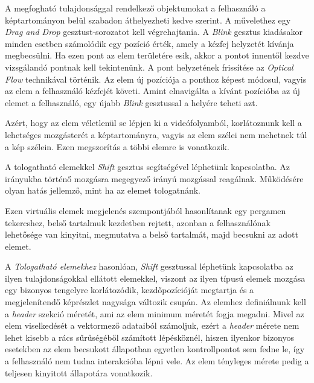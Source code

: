 
A megfogható tulajdonsággal rendelkező objektumokat a felhasználó a képtartományon belül szabadon áthelyezheti kedve szerint. A művelethez egy \textit{Drag and Drop} gesztust-sorozatot kell végrehajtania. A \textit{Blink} gesztus kiadásakor minden esetben számolódik egy pozíció érték, amely a kézfej helyzetét kívánja megbecsülni. Ha ezen pont az elem területére esik, akkor a pontot innentől kezdve vizsgálandó pontnak kell tekintenünk. A pont helyzetének frissítése az \textit{Optical Flow} technikával történik. Az elem új pozíciója a ponthoz képest módosul, vagyis az elem a felhasználó kézfejét követi.
Amint elnavigálta a kívánt pozícióba az új elemet a felhasználó, egy újabb \textit{Blink} gesztussal a helyére teheti azt.

Azért, hogy az elem véletlenül se lépjen ki a videófolyamból, korlátoznunk kell a lehetséges mozgásterét a képtartományra, vagyis az elem szélei nem mehetnek túl a kép szélein. Ezen megszorítás a többi elemre is vonatkozik.


A tologatható elemekkel \textit{Shift} gesztus segítségével léphetünk kapcsolatba. Az irányukba történő mozgásra megegyező irányú mozgással reagálnak. Működésére olyan hatás jellemző, mint ha az elemet tologatnánk.


Ezen virtuális elemek megjelenés szempontjából hasonlítanak egy pergamen tekercshez, belső tartalmuk kezdetben rejtett, azonban a felhasználónak lehetősége van kinyitni, megmutatva a belső tartalmát, majd becsukni az adott elemet.

A \textit{Tologatható elemekhez} hasonlóan, \textit{Shift} gesztussal léphetünk kapcsolatba az ilyen tulajdonságokkal ellátott elemekkel, viszont az ilyen típusú elemek mozgása egy bizonyos tengelyre korlátozódik, kezdőpozícióját megtartja és a megjelenítendő képrészlet nagysága változik csupán. Az elemhez definiálnunk kell a \textit{header} szekció méretét, ami az elem minimum méretét fogja megadni. Mivel az elem viselkedését a vektormező adataiból számoljuk, ezért a \textit{header} mérete nem lehet kisebb a rács sűrűségéből számított lépésköznél, hiszen ilyenkor bizonyos esetekben az elem becsukott állapotban egyetlen kontrollpontot sem fedne le, így a felhasználó nem tudna interakcióba lépni vele.
Az elem tényleges mérete pedig a teljesen kinyitott állapotára vonatkozik.


